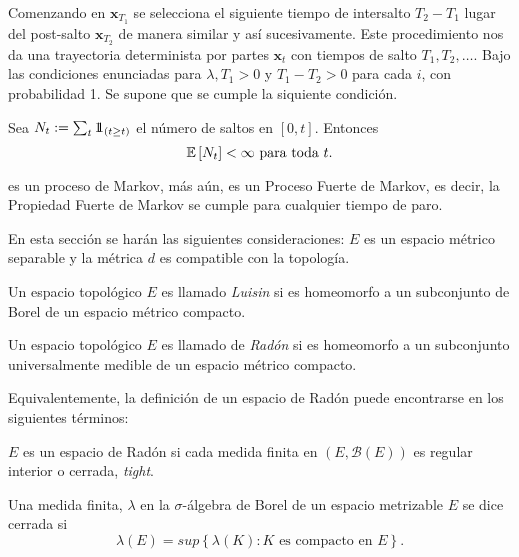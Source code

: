 Comenzando en $\mathbf{x}_{T_{1}}$ se selecciona el siguiente
tiempo de intersalto $T_{2}-T_{1}$ lugar del post-salto
$\mathbf{x}_{T_{2}}$ de manera similar y as\'i sucesivamente. Este
procedimiento nos da una trayectoria determinista por partes
$\mathbf{x}_{t}$ con tiempos de salto $T_{1},T_{2},\ldots$. Bajo
las condiciones enunciadas para $\lambda,T_{1}>0$  y
$T_{1}-T_{2}>0$ para cada $i$, con probabilidad 1. Se supone que
se cumple la siquiente condici\'on.

\begin{Sup}\label{Sup3.1.Davis}
Sea $N_{t}:=\sum_{t}\mbox{$1$\hspace{-0.8ex}$1$}_{\left(t\geq t\right)}$ el n\'umero de
saltos en $\left[0,t\right]$. Entonces
\begin{equation}
\mathbb{E}\left[N_{t}\right]<\infty\textrm{ para toda }t.
\end{equation}
\end{Sup}

es un proceso de Markov, m\'as a\'un, es un Proceso Fuerte de
Markov, es decir, la Propiedad Fuerte de Markov se cumple para
cualquier tiempo de paro.

En esta secci\'on se har\'an las siguientes consideraciones: $E$
es un espacio m\'etrico separable y la m\'etrica $d$ es compatible
con la topolog\'ia.


\begin{Def}
Un espacio topol\'ogico $E$ es llamado {\em Luisin} si es
homeomorfo a un subconjunto de Borel de un espacio m\'etrico
compacto.
\end{Def}

\begin{Def}
Un espacio topol\'ogico $E$ es llamado de {\em Rad\'on} si es
homeomorfo a un subconjunto universalmente medible de un espacio
m\'etrico compacto.
\end{Def}

Equivalentemente, la definici\'on de un espacio de Rad\'on puede
encontrarse en los siguientes t\'erminos:


\begin{Def}
$E$ es un espacio de Rad\'on si cada medida finita en
$\left(E,\mathcal{B}\left(E\right)\right)$ es regular interior o cerrada,
{\em tight}.
\end{Def}

\begin{Def}
Una medida finita, $\lambda$ en la $\sigma$-\'algebra de Borel de
un espacio metrizable $E$ se dice cerrada si
\begin{equation}\label{Eq.A2.3}
\lambda\left(E\right)=sup\left\{\lambda\left(K\right):K\textrm{ es
compacto en }E\right\}.
\end{equation}
\end{Def}

